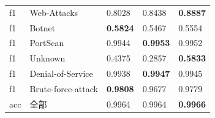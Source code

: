 \begin{table}[htb]
\begin{adjustbox}{max width=.535\textwidth}
\begin{tabular}{lllll}
        f1 & Web-Attacks & 0.8028 & 0.8438 & \textbf{0.8887} \\
        f1 & Botnet & \textbf{0.5824} & 0.5467 & 0.5554 \\
        f1 & PortScan & 0.9944 & \textbf{0.9953} & 0.9952 \\
        f1 & Unknown & 0.4375 & 0.2857 & \textbf{0.5833} \\
        f1 & Denial-of-Service & 0.9938 & \textbf{0.9947} & 0.9945 \\
        f1 & Brute-force-attack & \textbf{0.9808} & 0.9677 & 0.9779 \\
        acc& 全部& 0.9964 & 0.9964 & \textbf{0.9966} \\
    \bottomrule
    \end{tabular}
    \end{adjustbox}
    \label{tab:exp_pe-tr-none}
\end{table}

